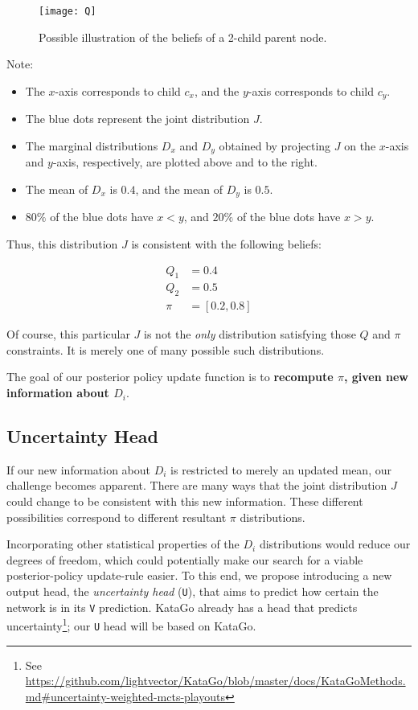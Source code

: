 \documentclass[tikz]{article}
\begin{document}
\begin{figure}[h]
\caption{Possible illustration of the beliefs of a 2-child parent node.}
\label{Q-figure}
\centering
\texttt{[image: Q]}
\end{figure}

Note:

\begin{itemize}
    \item The $x$-axis corresponds to child $c_x$, and the $y$-axis corresponds to child $c_y$.
    \item The blue dots represent the joint distribution $J$.
    \item The marginal distributions $D_x$ and $D_y$ obtained by projecting $J$ on the $x$-axis and $y$-axis, respectively, are plotted above and to the right.
    \item The mean of $D_x$ is $0.4$, and the mean of $D_y$ is $0.5$.
    \item $80\%$ of the blue dots have $x<y$, and $20\%$ of the blue dots have $x>y$.
\end{itemize}

Thus, this distribution $J$ is consistent with the following beliefs:

\begin{align*}
Q_1 &= 0.4 \\
Q_2 &= 0.5 \\
\pi &= [0.2, 0.8]
\end{align*}

Of course, this particular $J$ is not the \emph{only} distribution satisfying those $Q$ and $\pi$ constraints. It is merely one of
many possible such distributions. \newline

The goal of our posterior policy update function is to \textbf{recompute $\pi$, given new information about $D_i$}.

\subsection{Uncertainty Head}

If our new information about $D_i$ is restricted to merely an updated mean, our challenge becomes apparent. There are many ways that the joint 
distribution $J$ could change to be consistent with this new information. These different possibilities correspond to different
resultant $\pi$ distributions. \newline

Incorporating other statistical properties of the $D_i$ distributions would reduce our degrees of freedom, which could potentially
make our search for a viable posterior-policy update-rule easier. To this end, we propose introducing a new output head, the \emph{uncertainty head} (\texttt{U}),
that aims to predict how certain the network is in its \texttt{V} prediction. KataGo already has a head that predicts uncertainty\footnote{See \url{https://github.com/lightvector/KataGo/blob/master/docs/KataGoMethods.md\#uncertainty-weighted-mcts-playouts}}; our \texttt{U} head will
be based on KataGo. \newline
\end{document}
